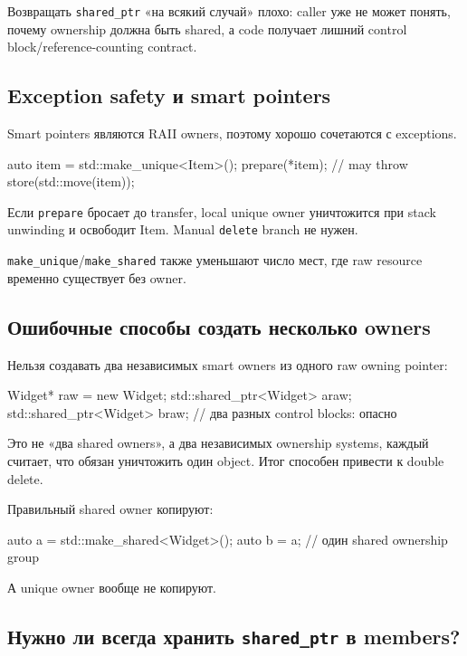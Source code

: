 Возвращать \texttt{shared\_ptr} «на всякий случай» плохо: caller уже не может
понять, почему ownership должна быть shared, а code получает лишний control
block/reference-counting contract.

\subsection{Exception safety и smart pointers}

Smart pointers являются RAII owners, поэтому хорошо сочетаются с exceptions.

\begin{cppcode}
auto item = std::make_unique<Item>();
prepare(*item);       // may throw
store(std::move(item));
\end{cppcode}

Если \texttt{prepare} бросает до transfer, local unique owner уничтожится при
stack unwinding и освободит Item. Manual \texttt{delete} branch не нужен.

\texttt{make\_unique}/\texttt{make\_shared} также уменьшают число мест, где
raw resource временно существует без owner.

\subsection{Ошибочные способы создать несколько owners}

Нельзя создавать два независимых smart owners из одного raw owning pointer:

\begin{cppcode}
Widget* raw = new Widget;
std::shared_ptr<Widget> a{raw};
std::shared_ptr<Widget> b{raw}; // два разных control blocks: опасно
\end{cppcode}

Это не «два shared owners», а два независимых ownership systems, каждый считает,
что обязан уничтожить один object. Итог способен привести к double delete.

Правильный shared owner копируют:

\begin{cppcode}
auto a = std::make_shared<Widget>();
auto b = a; // один shared ownership group
\end{cppcode}

А unique owner вообще не копируют.

\subsection{Нужно ли всегда хранить \texttt{shared\_ptr} в members?}


